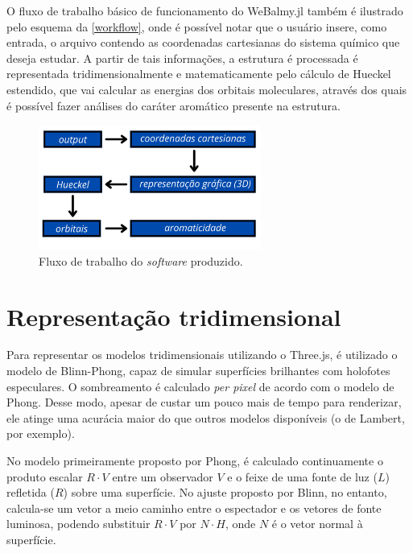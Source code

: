 O fluxo de trabalho básico de funcionamento do WeBalmy.jl também é ilustrado pelo esquema da \autoref{workflow}, onde é possível notar que o usuário insere, como entrada, o arquivo contendo as coordenadas cartesianas do sistema químico que deseja estudar. A partir de tais informações, a estrutura é processada é representada tridimensionalmente e matematicamente pelo cálculo de Hueckel estendido, que vai calcular as energias dos orbitais moleculares, através dos quais é possível fazer análises do caráter aromático presente na estrutura.

\begin{figure}[htb]
	\caption{\label{workflow} Fluxo de trabalho do \textit{software} produzido.}
	\begin{center}
		\includegraphics[width=0.65\textwidth]{images/workflow.png}
	\end{center}
\end{figure}

\section{Representação tridimensional}
Para representar os modelos tridimensionais utilizando o Three.js, é utilizado o modelo de Blinn-Phong, capaz de simular superfícies brilhantes com holofotes especulares. O sombreamento é calculado \textit{per pixel} de acordo com o modelo de Phong. Desse modo, apesar de custar um pouco mais de tempo para renderizar, ele atinge uma acurácia maior do que outros modelos disponíveis (o de Lambert, por exemplo).

No modelo primeiramente proposto por Phong, é calculado continuamente o produto escalar $R \cdot V$ entre um observador $V$ e o feixe de uma fonte de luz ($L$) refletida ($R$) sobre uma superfície. No ajuste proposto por Blinn, no entanto, calcula-se um vetor a meio caminho entre o espectador e os vetores de fonte luminosa, podendo substituir $R \cdot V$ por $N \cdot H$, onde $N$ é o vetor normal à superfície.

